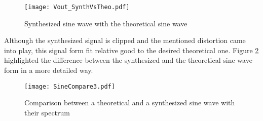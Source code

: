 \begin{figure}[htb!]
   \centering
   \texttt{[image: Vout\_SynthVsTheo.pdf]}
   \caption{Synthesized sine wave with the theoretical sine wave}
   \label{fig:SineWaveSynthVsTheoretical}
\end{figure}
Although the synthesized signal is clipped and the mentioned distortion came into play, this signal form fit relative good to the desired theoretical one.
Figure \ref{fig:SineCompare} highlighted the difference between the synthesized and the theoretical sine wave form in a more detailed way.

\begin{figure}[htb!]
	\centering
  \texttt{[image: SineCompare3.pdf]}
	\caption{Comparison between a theoretical and a synthesized sine wave with their spectrum}
	\label{fig:SineCompare}
\end{figure}

